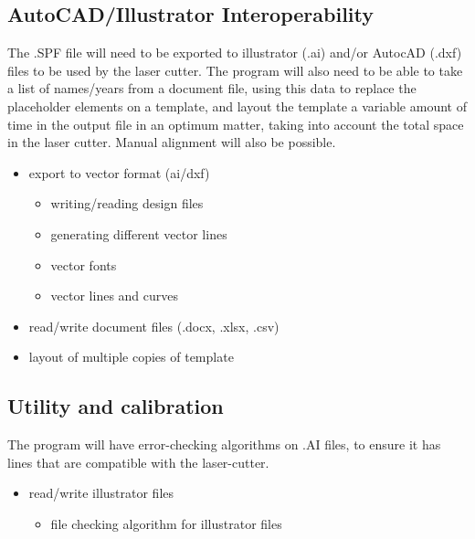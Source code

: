 \documentclass[oneside,openany,11pt,a4paper]{report}
\begin{document}
\subsection{AutoCAD/Illustrator Interoperability}
The .SPF file will need to be exported to illustrator (.ai) and/or AutocAD (.dxf) files to be used by the laser cutter. The program will also need to be able to take a list of names/years from a document file, using this data to replace the placeholder elements on a template, and layout the template a variable amount of time in the output file in an optimum matter, taking into account the total space in the laser cutter. Manual alignment will also be possible.
\begin{itemize}
	\item export to vector format (ai/dxf)
	\begin{itemize}
		\itemsep0em
        \item writing/reading design files
        \item generating different vector lines
        \item vector fonts
        \item vector lines and curves
    \end{itemize}
    \item read/write document files (.docx, .xlsx, .csv)
    \item layout of multiple copies of template
\end{itemize}

\subsection{Utility and calibration}
The program will have error-checking algorithms on .AI files, to ensure it has lines that are compatible with the laser-cutter. 
\begin{itemize}
	\item read/write illustrator files 
	\begin{itemize}
    	\item file checking algorithm for illustrator files
  	\end{itemize}
\end{itemize}
\end{document}
